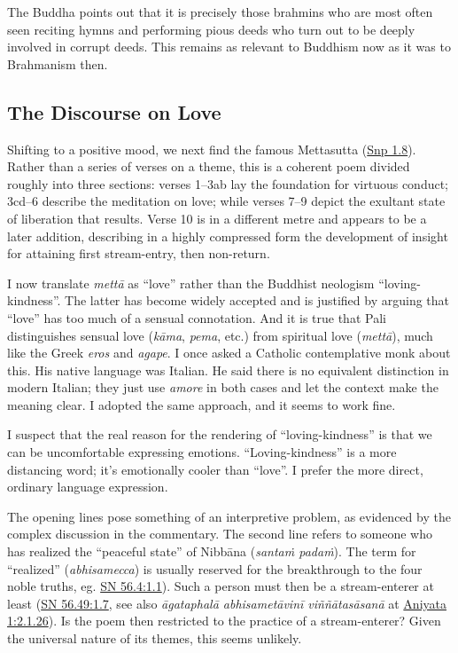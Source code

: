 \documentclass[12pt,openany]{book}%
\begin{document}
The Buddha points out that it is precisely those brahmins who are most often seen reciting hymns and performing pious deeds who turn out to be deeply involved in corrupt deeds. This remains as relevant to Buddhism now as it was to Brahmanism then.

\subsection*{The Discourse on Love}

Shifting to a positive mood, we next find the famous Mettasutta (\href{https://suttacentral.net/snp1.8/en/sujato}{Snp 1.8}). Rather than a series of verses on a theme, this is a coherent poem divided roughly into three sections: verses 1–3ab lay the foundation for virtuous conduct; 3cd–6 describe the meditation on love; while verses 7–9 depict the exultant state of liberation that results. Verse 10 is in a different metre and appears to be a later addition, describing in a highly compressed form the development of insight for attaining first stream-entry, then non-return.

I now translate \textit{\textsanskrit{mettā}} as “love” rather than the Buddhist neologism “loving-kindness”. The latter has become widely accepted and is justified by arguing that “love” has too much of a sensual connotation. And it is true that Pali distinguishes sensual love (\textit{\textsanskrit{kāma}}, \textit{pema}, etc.) from spiritual love (\textit{\textsanskrit{mettā}}), much like the Greek \emph{eros} and \emph{agape}. I once asked a Catholic contemplative monk about this. His native language was Italian. He said there is no equivalent distinction in modern Italian; they just use \emph{amore} in both cases and let the context make the meaning clear. I adopted the same approach, and it seems to work fine.

I suspect that the real reason for the rendering of “loving-kindness” is that we can be uncomfortable expressing emotions. “Loving-kindness” is a more distancing word; it’s emotionally cooler than “love”. I prefer the more direct, ordinary language expression.

The opening lines pose something of an interpretive problem, as evidenced by the complex discussion in the commentary. The second line refers to someone who has realized the “peaceful state” of \textsanskrit{Nibbāna} (\textit{\textsanskrit{santaṁ} \textsanskrit{padaṁ}}). The term for “realized” (\textit{abhisamecca}) is usually reserved for the breakthrough to the four noble truths, eg. \href{https://suttacentral.net/sn56.4/en/sujato\#1.1}{SN 56.4:1.1}). Such a person must then be a stream-enterer at least (\href{https://suttacentral.net/sn56.49/en/sujato\#1.7}{SN 56.49:1.7}, see also \textit{\textsanskrit{āgataphalā} \textsanskrit{abhisametāvinī} \textsanskrit{viññātasāsanā}} at \href{https://suttacentral.net/pli{-}tv{-}bu{-}vb{-}ay1/en/brahmali\#2.1.26}{Aniyata 1:2.1.26}). Is the poem then restricted to the practice of a stream-enterer? Given the universal nature of its themes, this seems unlikely.
\end{document}
